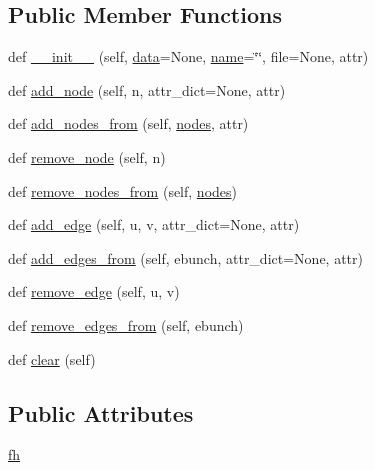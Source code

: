\subsection*{Public Member Functions}
\begin{DoxyCompactItemize}
\item 
def \hyperlink{classplot__printgraph_1_1PrintGraph_abba871324158dfd4e08eccfbcac6761d}{\+\_\+\+\_\+init\+\_\+\+\_\+} (self, \hyperlink{namespaceplot__printgraph_aa2569a7aae75b982ab179192f0bd9102}{data}=None, \hyperlink{classnetworkx_1_1classes_1_1graph_1_1Graph_a8dd1e8272154babfd15aff6876d0f8f4}{name}=\char`\"{}\char`\"{}, file=None, attr)
\item 
def \hyperlink{classplot__printgraph_1_1PrintGraph_a78c5c15d7ad389abe03040b7dfa645a5}{add\+\_\+node} (self, n, attr\+\_\+dict=None, attr)
\item 
def \hyperlink{classplot__printgraph_1_1PrintGraph_aa2839e5831c7a5f4e4ebbbd67d89223f}{add\+\_\+nodes\+\_\+from} (self, \hyperlink{classnetworkx_1_1classes_1_1graph_1_1Graph_ab5b03b460e5b1f2a06feaddcfb4fda3a}{nodes}, attr)
\item 
def \hyperlink{classplot__printgraph_1_1PrintGraph_a8ca534571da1b0411328428468246ea6}{remove\+\_\+node} (self, n)
\item 
def \hyperlink{classplot__printgraph_1_1PrintGraph_aa4ffcf9260502f05c80821bb3cd2fc1f}{remove\+\_\+nodes\+\_\+from} (self, \hyperlink{classnetworkx_1_1classes_1_1graph_1_1Graph_ab5b03b460e5b1f2a06feaddcfb4fda3a}{nodes})
\item 
def \hyperlink{classplot__printgraph_1_1PrintGraph_aa6554ad81cd3cf39d1a4897a57b934d3}{add\+\_\+edge} (self, u, v, attr\+\_\+dict=None, attr)
\item 
def \hyperlink{classplot__printgraph_1_1PrintGraph_af32c071b3b1e220adcb5eac8e5c85015}{add\+\_\+edges\+\_\+from} (self, ebunch, attr\+\_\+dict=None, attr)
\item 
def \hyperlink{classplot__printgraph_1_1PrintGraph_a44e5c86b3dfbbbcd7ad356c3af0ed9d5}{remove\+\_\+edge} (self, u, v)
\item 
def \hyperlink{classplot__printgraph_1_1PrintGraph_a6301c8d0c18b804997c4ac05d8a86c4e}{remove\+\_\+edges\+\_\+from} (self, ebunch)
\item 
def \hyperlink{classplot__printgraph_1_1PrintGraph_a4775dac97bae0e5cbb9ed382b21ed08e}{clear} (self)
\end{DoxyCompactItemize}
\subsection*{Public Attributes}
\begin{DoxyCompactItemize}
\item 
\hyperlink{classplot__printgraph_1_1PrintGraph_aebbba8f38418150bb2cea99a08ee7a11}{fh}
\end{DoxyCompactItemize}
